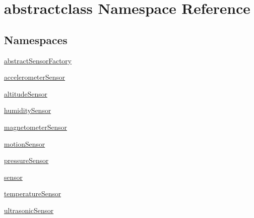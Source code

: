 \hypertarget{namespaceabstractclass}{}\section{abstractclass Namespace Reference}
\label{namespaceabstractclass}
\subsection*{Namespaces}
\begin{DoxyCompactItemize}
\item 
 \hyperlink{namespaceabstractclass_1_1abstractSensorFactory}{abstract\+Sensor\+Factory}
\item 
 \hyperlink{namespaceabstractclass_1_1accelerometerSensor}{accelerometer\+Sensor}
\item 
 \hyperlink{namespaceabstractclass_1_1altitudeSensor}{altitude\+Sensor}
\item 
 \hyperlink{namespaceabstractclass_1_1humiditySensor}{humidity\+Sensor}
\item 
 \hyperlink{namespaceabstractclass_1_1magnetometerSensor}{magnetometer\+Sensor}
\item 
 \hyperlink{namespaceabstractclass_1_1motionSensor}{motion\+Sensor}
\item 
 \hyperlink{namespaceabstractclass_1_1pressureSensor}{pressure\+Sensor}
\item 
 \hyperlink{namespaceabstractclass_1_1sensor}{sensor}
\item 
 \hyperlink{namespaceabstractclass_1_1temperatureSensor}{temperature\+Sensor}
\item 
 \hyperlink{namespaceabstractclass_1_1ultrasonicSensor}{ultrasonic\+Sensor}
\end{DoxyCompactItemize}
